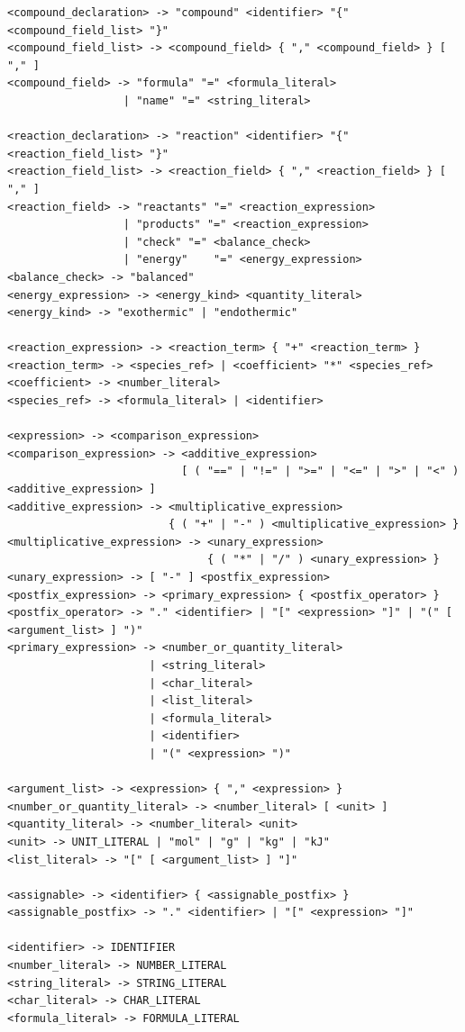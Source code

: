 \documentclass[11pt,a4paper]{article}
\begin{document}
\begin{lstlisting}[style=ebnf]
<compound_declaration> -> "compound" <identifier> "{" <compound_field_list> "}"
<compound_field_list> -> <compound_field> { "," <compound_field> } [ "," ]
<compound_field> -> "formula" "=" <formula_literal>
                  | "name" "=" <string_literal>

<reaction_declaration> -> "reaction" <identifier> "{" <reaction_field_list> "}"
<reaction_field_list> -> <reaction_field> { "," <reaction_field> } [ "," ]
<reaction_field> -> "reactants" "=" <reaction_expression>
                  | "products" "=" <reaction_expression>
                  | "check" "=" <balance_check>
                  | "energy"    "=" <energy_expression>
<balance_check> -> "balanced"
<energy_expression> -> <energy_kind> <quantity_literal>
<energy_kind> -> "exothermic" | "endothermic"

<reaction_expression> -> <reaction_term> { "+" <reaction_term> }
<reaction_term> -> <species_ref> | <coefficient> "*" <species_ref>
<coefficient> -> <number_literal>
<species_ref> -> <formula_literal> | <identifier>

<expression> -> <comparison_expression>
<comparison_expression> -> <additive_expression>
                           [ ( "==" | "!=" | ">=" | "<=" | ">" | "<" ) <additive_expression> ]
<additive_expression> -> <multiplicative_expression>
                         { ( "+" | "-" ) <multiplicative_expression> }
<multiplicative_expression> -> <unary_expression>
                               { ( "*" | "/" ) <unary_expression> }
<unary_expression> -> [ "-" ] <postfix_expression>
<postfix_expression> -> <primary_expression> { <postfix_operator> }
<postfix_operator> -> "." <identifier> | "[" <expression> "]" | "(" [ <argument_list> ] ")"
<primary_expression> -> <number_or_quantity_literal>
                      | <string_literal>
                      | <char_literal>
                      | <list_literal>
                      | <formula_literal>
                      | <identifier>
                      | "(" <expression> ")"

<argument_list> -> <expression> { "," <expression> }
<number_or_quantity_literal> -> <number_literal> [ <unit> ]
<quantity_literal> -> <number_literal> <unit>
<unit> -> UNIT_LITERAL | "mol" | "g" | "kg" | "kJ"
<list_literal> -> "[" [ <argument_list> ] "]"

<assignable> -> <identifier> { <assignable_postfix> }
<assignable_postfix> -> "." <identifier> | "[" <expression> "]"

<identifier> -> IDENTIFIER
<number_literal> -> NUMBER_LITERAL
<string_literal> -> STRING_LITERAL
<char_literal> -> CHAR_LITERAL
<formula_literal> -> FORMULA_LITERAL
\end{lstlisting}
\end{document}
